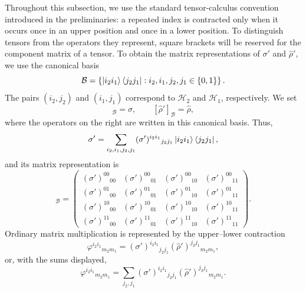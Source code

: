 \documentclass[
    aps,
    pra,
    reprint,
    superscriptaddress,
    nofootinbib
]{revtex4-2}
\theoremstyle{definition}
\theoremstyle{plain}
\begin{document}
Throughout this subsection, we use the standard tensor-calculus
convention introduced in the preliminaries: a repeated index is
contracted only when it occurs once in an upper position and once in a
lower position. To distinguish tensors from the operators they
represent, square brackets will be reserved for the component matrix of
a tensor. To obtain the matrix representations of $\sigma'$ and
$\hat{\rho}'$, we use the canonical basis
\begin{equation}
    \mathcal{B}
    =
    \left\{
        \ket{i_{2}i_{1}}\bra{j_{2}j_{1}}
        :
        i_{2},i_{1},j_{2},j_{1}\in\{0,1\}
    \right\}.
\end{equation}
The pairs $(i_{2},j_{2})$ and $(i_{1},j_{1})$ correspond to
$\mathcal{H}_{2}$ and $\mathcal{H}_{1}$, respectively. We set
\begin{equation*}
    [\sigma']_{\mathcal{B}}=\sigma,
    \qquad
    [\hat{\rho}']_{\mathcal{B}}=\hat{\rho},
\end{equation*}
where the operators on the right are written in this canonical basis.
Thus,
\begin{equation}
    \sigma'
    =
    \sum_{i_{2},i_{1},j_{2},j_{1}}
    (\sigma')^{i_{2}i_{1}}{}_{j_{2}j_{1}}
    \ket{i_{2}i_{1}}\bra{j_{2}j_{1}},
\end{equation}
and its matrix representation is
\begin{equation}
    [\sigma']_{\mathcal{B}}
    =
    \begin{pmatrix}
        (\sigma')^{00}{}_{00}&(\sigma')^{00}{}_{01}&
        (\sigma')^{00}{}_{10}&(\sigma')^{00}{}_{11}\\
        (\sigma')^{01}{}_{00}&(\sigma')^{01}{}_{01}&
        (\sigma')^{01}{}_{10}&(\sigma')^{01}{}_{11}\\
        (\sigma')^{10}{}_{00}&(\sigma')^{10}{}_{01}&
        (\sigma')^{10}{}_{10}&(\sigma')^{10}{}_{11}\\
        (\sigma')^{11}{}_{00}&(\sigma')^{11}{}_{01}&
        (\sigma')^{11}{}_{10}&(\sigma')^{11}{}_{11}
    \end{pmatrix}.
\end{equation}
Ordinary matrix multiplication is represented by the upper--lower
contraction
\begin{equation}
    \varphi^{i_{2}i_{1}}{}_{m_{2}m_{1}}
    =
    (\sigma')^{i_{2}i_{1}}{}_{j_{2}j_{1}}
    (\hat{\rho}')^{j_{2}j_{1}}{}_{m_{2}m_{1}},
\end{equation}
or, with the sums displayed,
\begin{equation}
    \varphi^{i_{2}i_{1}}{}_{m_{2}m_{1}}
    =
    \sum_{j_{2},j_{1}}
    (\sigma')^{i_{2}i_{1}}{}_{j_{2}j_{1}}
    (\hat{\rho}')^{j_{2}j_{1}}{}_{m_{2}m_{1}}.
\end{equation}
\end{document}
